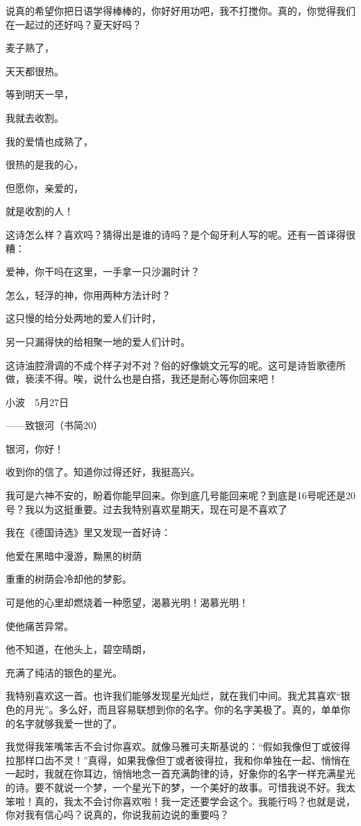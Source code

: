 说真的希望你把日语学得棒棒的，你好好用功吧，我不打搅你。真的，你觉得我们在一起过的还好吗？夏天好吗？ 

麦子熟了， 

天天都很热。 

等到明天一早， 

我就去收割。 

我的爱情也成熟了， 

很热的是我的心， 

但愿你，亲爱的，　 

就是收割的人！ 

这诗怎么样？喜欢吗？猜得出是谁的诗吗？是个匈牙利人写的呢。还有一首译得很糟： 

爱神，你干吗在这里，一手拿一只沙漏时计？ 

怎么，轻浮的神，你用两种方法计时？ 

这只慢的给分处两地的爱人们计时， 

另一只漏得快的给相聚一地的爱人们计时。 

这诗油腔滑调的不成个样子对不对？俗的好像姚文元写的呢。这可是诗哲歌德所做，亵渎不得。唉，说什么也是白搭，我还是耐心等你回来吧！ 

小波　5月27日 





——致银河（书简20） 

银河，你好！ 

收到你的信了。知道你过得还好，我挺高兴。 

我可是六神不安的，盼着你能早回来。你到底几号能回来呢？到底是16号呢还是20号？我以为这挺重要。过去我特别喜欢星期天，现在可是不喜欢了 

我在《德国诗选》里又发现一首好诗： 

他爱在黑暗中漫游，黝黑的树荫 

重重的树荫会冷却他的梦影。 

可是他的心里却燃烧着一种愿望，渴慕光明！渴慕光明！ 

使他痛苦异常。 

他不知道，在他头上，碧空晴朗， 

充满了纯洁的银色的星光。 

我特别喜欢这一首。也许我们能够发现星光灿烂，就在我们中间。我尤其喜欢“银色的月光”。多么好，而且容易联想到你的名字。你的名字美极了。真的，单单你的名字就够我爱一世的了。 

我觉得我笨嘴笨舌不会讨你喜欢。就像马雅可夫斯基说的：“假如我像但丁或彼得拉那样口齿不灵！”真得，如果我像但丁或者彼得拉，我和你单独在一起、悄悄在一起时，我就在你耳边，悄悄地念一首充满韵律的诗，好象你的名字一样充满星光的诗。要不就说一个梦，一个星光下的梦，一个美好的故事。可惜我说不好。我太笨啦！真的，我太不会讨你喜欢啦！我一定还要学会这个。我能行吗？也就是说，你对我有信心吗？说真的，你说我前边说的重要吗？ 

